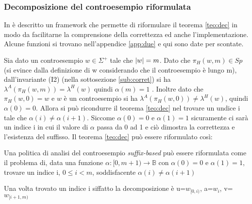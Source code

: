 \subsubsection{Decomposizione del controesempio riformulata}
In \cite{StefCounterexample14} è descritto un framework che permette di riformulare il teorema \ref{teo:dec} in modo da facilitarne la comprensione della correttezza ed anche l'implementazione. Alcune funzioni si trovano nell'appendice \ref{app:due} e qui sono date per scontate.

Sia dato un controesempio $w \in \Sigma^{+}$ tale che $\lvert w\rvert=m$. Dato che $\pi_{H}(w,m) \in Sp$ (si evince dalla definizione di w considerando che il controesempio è lungo m), dall'invariante (I2) (nella sottosezione \ref{sub:corret}) si ha $\lambda^{A}(\pi_{H}(w,m)) = \lambda^{H}(w)$ quindi $\alpha(m) = 1$ . Inoltre dato che $\pi_{H}(w,0) = w$ e $w$ è un controesempio si ha $\lambda^{A}(\pi_{H}(w,0)) \neq \lambda^{H}(w)$, quindi $\alpha(0) = 0$. Allora si può ricondurre il teorema \ref{teo:dec} nel trovare un undice i tale che $\alpha(i) \neq \alpha(i+1)$. Siccome $\alpha(0)=0 \text{ e } \alpha(1)=1$ sicuramente ci sarà un indice i in cui il valore di $\alpha$ passa da 0 ad 1 e ciò dimostra la correttezza e l'esistenza del suffisso. Il teorema \ref{teo:dec} può essere riformulato così:
\begin{teorema} \label{teo:decr}Una politica di analisi del controesempio \textit{suffix-based} può essere riformulata come il problema di, data una funzione $\alpha: [0,m+1) \to \mathbb{B}$ con $\alpha(0)=0 \text{ e } \alpha(1)=1$, trovare un indice i, $0 \leq i < m$, soddisfacente $\alpha(i) \neq \alpha(i+1)$ 
\end{teorema}
Una volta trovato un indice i siffatto la decomposizione è u=$w_{[0,i)}$, a=$w_{i}$, v=$w_{[i+1,m)}$

